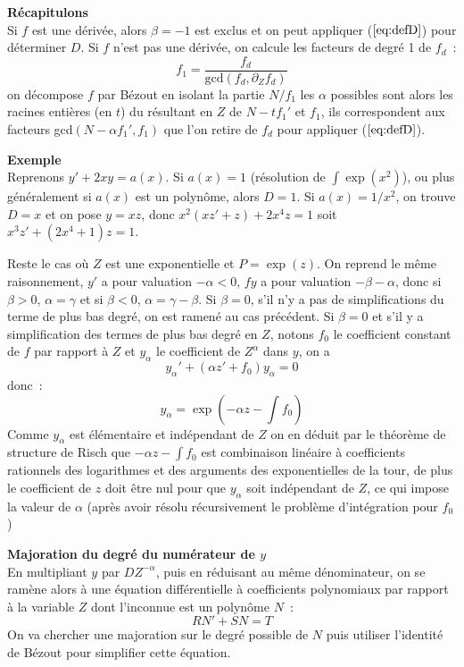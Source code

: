 \documentclass[a4paper,11pt]{book}
\begin{document}
\begin{giacjshere}
{\bf Récapitulons}\\
Si $f$ est une dérivée, alors $\beta=-1$ est exclus et on peut
appliquer (\(\ref{eq:defD}\)) pour déterminer $D$. Si $f$ n'est
pas une dérivée, on calcule les facteurs de degré 1 de $f_d$~:
\[ f_1=\frac{f_d}{\mbox{gcd}(f_d,\partial_Z f_d)} \]
on décompose $f$ par Bézout en isolant la partie $N/f_1$
les $\alpha$ possibles sont alors les racines entières (en $t$)
du résultant en $Z$ de $N-tf_1'$ et $f_1$, ils correspondent aux
facteurs gcd$(N-\alpha f_1',f_1)$ que l'on retire de $f_d$ pour
appliquer (\(\ref{eq:defD}\)).

{\bf Exemple}\\
Reprenons $y'+2xy=a(x)$. Si $a(x)=1$ (résolution de $\int \exp(x^2)$),
ou plus généralement si $a(x)$ est un polynôme,
alors $D=1$. Si $a(x)=1/x^2$, on trouve $D=x$ et on pose $y=xz$,
donc $x^2(xz'+z)+2x^4z=1$ soit $x^3z'+(2x^4+1)z=1$.

Reste le cas o\`u $Z$ est une exponentielle et $P=\exp(z)$. On reprend
le m\^eme raisonnement, $y'$ a pour valuation $-\alpha<0$, $fy$ a pour
valuation $-\beta-\alpha$, donc si $\beta > 0$,
$\alpha=\gamma$ et si $\beta<0$, $\alpha=\gamma-\beta$.
Si $\beta=0$, s'il n'y a pas de simplifications du terme de plus bas
degr\'e, on est ramen\'e au cas pr\'ec\'edent. 
Si $\beta=0$ et s'il y a simplification des termes de plus
bas degr\'e en $Z$, notons $f_0$ le coefficient constant de $f$ 
par rapport \`a $Z$ et $y_{\alpha}$ le coefficient de $Z^{\alpha}$
dans $y$, on a 
\[ y_\alpha ' + (\alpha z' + f_0) y_\alpha =0 \]
donc~:
\[ y_\alpha= \exp(-\alpha z-\int f_0)\]
Comme $y_\alpha$ est \'el\'ementaire et ind\'ependant de $Z$
on en d\'eduit par le th\'eor\`eme de structure de Risch
que $-\alpha z -\int f_0$ est combinaison lin\'eaire \`a coefficients
rationnels des logarithmes et des arguments des exponentielles de la tour,
de plus le coefficient de $z$ doit \^etre nul pour que $y_\alpha$ soit
ind\'ependant de $Z$, ce qui impose la valeur de $\alpha$ (apr\`es avoir
r\'esolu r\'ecursivement le probl\`eme d'int\'egration pour $f_0$)

{\bf Majoration du degr\'e du num\'erateur de $y$}\\
En multipliant $y$ par $D Z^{-\alpha}$, puis en réduisant au
même dénominateur,
on se ram\`ene alors à une équation différentielle à coefficients
polynomiaux par rapport \`a la variable $Z$ dont l'inconnue est un polynôme 
$N$~:
\begin{equation} \label{eq:rischdepol}
 R N' + S N = T
\end{equation}
On va chercher une majoration sur le degr\'e possible de $N$ puis
utiliser l'identit\'e de B\'ezout pour simplifier
cette \'equation. 


\end{giacjshere}
\end{document}
